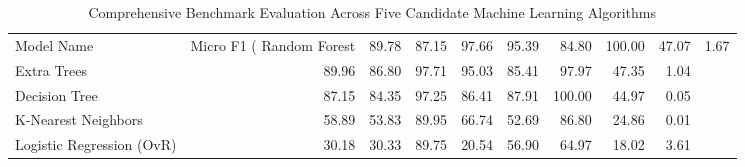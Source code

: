 \begin{table}
\caption{Comprehensive Benchmark Evaluation Across Five Candidate Machine Learning Algorithms}
\label{tab:model_benchmark}
\begin{tabular}{lrrrrrrrr}
\toprule
Model Name & Micro F1 (%
\midrule
Random Forest & 89.78 & 87.15 & 97.66 & 95.39 & 84.80 & 100.00 & 47.07 & 1.67 \\
Extra Trees & 89.96 & 86.80 & 97.71 & 95.03 & 85.41 & 97.97 & 47.35 & 1.04 \\
Decision Tree & 87.15 & 84.35 & 97.25 & 86.41 & 87.91 & 100.00 & 44.97 & 0.05 \\
K-Nearest Neighbors & 58.89 & 53.83 & 89.95 & 66.74 & 52.69 & 86.80 & 24.86 & 0.01 \\
Logistic Regression (OvR) & 30.18 & 30.33 & 89.75 & 20.54 & 56.90 & 64.97 & 18.02 & 3.61 \\
\bottomrule
\end{tabular}
\end{table}
